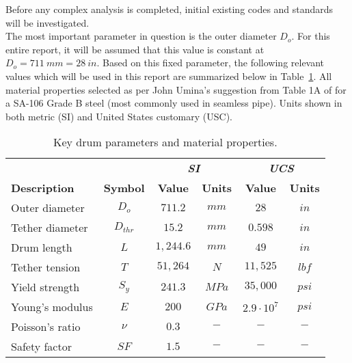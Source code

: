 \label{chapt:standards}

Before any complex analysis is completed, initial existing codes and standards will be investigated.\\

The most important parameter in question is the outer diameter $D_o$. For this entire report, it will be assumed that this value is constant at $D_o = 711\ mm = 28\ in$. Based on this fixed parameter, the following relevant values which will be used in this report are summarized below in Table~\ref{table:prelim_params}. All material properties selected as per John Umina's  suggestion from Table 1A of \cite{ASMEbvpcIID} for a SA-106 Grade B steel (most commonly used in seamless pipe). Units shown in both metric (SI) and United States customary (USC).\\

\begin{table}[ht]
	\caption{Key drum parameters and material properties.}
	\centering
    \begin{tabular}{lccccc}
          &       & \multicolumn{2}{c}{\textbf{\textit{SI}}} & \multicolumn{2}{c}{\textbf{\textit{UCS}}} \\
	\textbf{Description} & \textbf{Symbol} & \textbf{Value} & \textbf{Units} & \textbf{Value} & \textbf{Units} \\
    \midrule
    Outer diameter & $D_o$ & $711.2$ & $mm$  & $28$ & $in$ \\
    Tether diameter & $D_{thr}$ & $15.2$ & $mm$  & $0.598$ & $in$ \\
    Drum length & $L$   & $1,244.6$ & $mm$  & $49$ & $in$ \\
    Tether tension & $T$   & $51,264$ & $N$   & $11,525$ & $lbf$ \\
    Yield strength & $S_y$ & $241.3$ & $MPa$ & $35,000$ & $psi$ \\
    Young's modulus & $E$   & $200$ & $GPa$ & $2.9\cdot 10^7$ & $psi$ \\
    Poisson's ratio & $\nu$ & $0.3$ & $-$  & $-$    & $-$ \\
    Safety factor & $SF$ & $1.5$ & $-$  & $-$    & $-$ \\
    \end{tabular}%
  \label{table:prelim_params}
\end{table}

